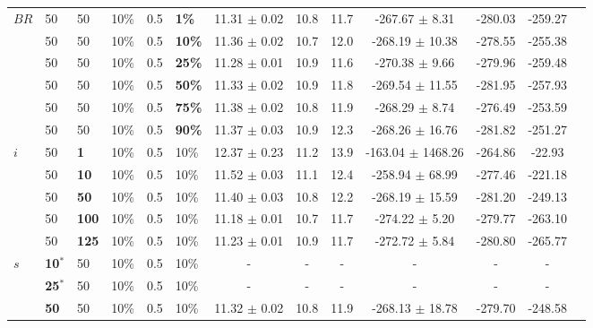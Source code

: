 \begin{sidewaystable}
\begin{tabular}{|l|l|l|l|l|l||c|c|c|c|c|c|c|}
    \hline
    $BR$ & 50 & 50 & 10\% & 0.5 & \textbf{1\%} & 11.31 $\pm$ 0.02 & 10.8 & 11.7  & -267.67 $\pm$ 8.31 & -280.03 & -259.27  \\
    ~    & 50 & 50 & 10\% & 0.5 & \textbf{10\%} & 11.36 $\pm$ 0.02 & 10.7 & 12.0  & -268.19 $\pm$ 10.38 & -278.55 & -255.38 \\
    ~    & 50 & 50 & 10\% & 0.5 & \textbf{25\%} & 11.28 $\pm$ 0.01 & 10.9 & 11.6  & -270.38 $\pm$ 9.66 & -279.96 & -259.48   \\
    ~    & 50 & 50 & 10\% & 0.5 & \textbf{50\%} & 11.33 $\pm$ 0.02 & 10.9 & 11.8 & -269.54 $\pm$ 11.55 & -281.95 & -257.93  \\
    ~    & 50 & 50 & 10\% & 0.5 & \textbf{75\%} & 11.38 $\pm$ 0.02 & 10.8 & 11.9  & -268.29 $\pm$ 8.74 & -276.49 & -253.59  \\
    ~    & 50 & 50 & 10\% & 0.5 & \textbf{90\%} & 11.37 $\pm$ 0.03 & 10.9 & 12.3 & -268.26 $\pm$ 16.76 & -281.82 & -251.27   \\
    \hline
    $i$ & 50 & \textbf{1} & 10\% & 0.5 & 10\% & 12.37 $\pm$ 0.23 & 11.2 & 13.9& -163.04 $\pm$ 1468.26 & -264.86 & -22.93  \\
    ~   & 50 &\textbf{10} & 10\% & 0.5 & 10\% & 11.52 $\pm$ 0.03 & 11.1 & 12.4 & -258.94 $\pm$ 68.99 & -277.46& -221.18 \\
    ~   & 50 &\textbf{50} & 10\% & 0.5 & 10\% & 11.40 $\pm$ 0.03 & 10.8 & 12.2 & -268.19 $\pm$ 15.59 & -281.20 & -249.13 \\
    ~   & 50 &\textbf{100} & 10\% & 0.5 & 10\% & 11.18 $\pm$ 0.01 & 10.7 & 11.7 & -274.22 $\pm$ 5.20  & -279.77 & -263.10 \\
    ~   & 50 &\textbf{125} & 10\% & 0.5 & 10\% & 11.23 $\pm$ 0.01 & 10.9 & 11.7 & -272.72 $\pm$ 5.84 & -280.80 & -265.77  \\
    \hline
    $s$ & \textbf{10$^*$} & 50 & 10\% & 0.5 & 10\% & - & - & - & - & -& -\\
    ~ & \textbf{25$^*$} & 50 & 10\% & 0.5 & 10\% & - & - & - & - & -& -  \\
    ~ & \textbf{50} & 50 & 10\% & 0.5 & 10\% & 11.32 $\pm$ 0.02 & 10.8 & 11.9 & -268.13 $\pm$ 18.78 & -279.70 & -248.58\\

\end{tabular}
\end{sidewaystable}
